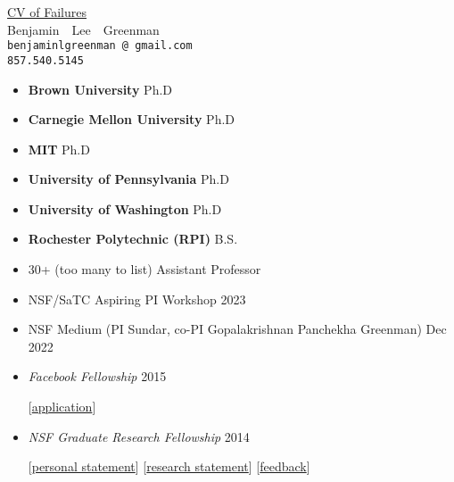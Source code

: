 \documentclass{article}
\makeatletter
\renewcommand{\maketitle}{
\begin{center}
  {\large{\href{https://www.princeton.edu/~joha/Johannes\_Haushofer\_CV\_of\_Failures.pdf}{CV of Failures}} \\
   \large{Benjamin~~Lee~~Greenman}}
\\\texttt{benjaminlgreenman\,@\,gmail.com}
\\\texttt{857.540.5145}
\end{center}
}
\makeatother
\begin{document}
\maketitle

{\centering{}}



\begin{itemize}
\item {\bf Brown University} \hfill Ph.D
\item {\bf Carnegie Mellon University} \hfill Ph.D
\item {\bf MIT} \hfill Ph.D
\item {\bf University of Pennsylvania} \hfill Ph.D
\item {\bf University of Washington} \hfill Ph.D
\item {\bf Rochester Polytechnic (RPI)} \hfill B.S.
\end{itemize}


\begin{itemize}
  \item 30+ (too many to list)  \hfill Assistant Professor
\end{itemize}


\begin{itemize}
\item NSF/SaTC Aspiring PI Workshop \hfill 2023
\item NSF Medium (PI Sundar, co-PI Gopalakrishnan Panchekha Greenman) \hfill Dec 2022
\item \emph{Facebook Fellowship} \hfill 2015
\item[] [\href{http://cs.utah.edu/~blg/cv/failures/facebook-2015-reject.pdf}{application}]
\item \emph{NSF Graduate Research Fellowship} \hfill 2014
\item[] [\href{https://cs.utah.edu/~blg/cv/failures/nsf-2014-personal-reject.pdf}{personal statement}]
        [\href{https://cs.utah.edu/~blg/cv/failures/nsf-2014-research-reject.pdf}{research statement}]
        [\href{https://cs.utah.edu/~blg/cv/failures/nsf-2014-reject-response.pdf}{feedback}]
\end{itemize}
\end{document}
